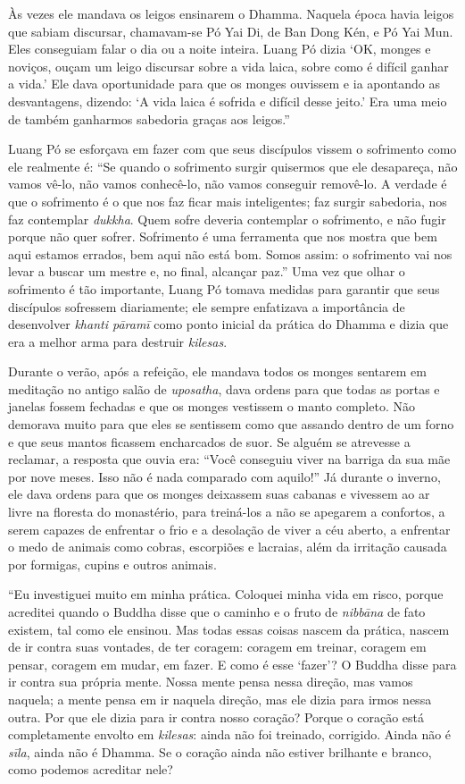 Às vezes ele mandava os leigos ensinarem o Dhamma. Naquela época havia
leigos que sabiam discursar, chamavam-se Pó Yai Di, de Ban Dong Kén, e
Pó Yai Mun. Eles conseguiam falar o dia ou a noite inteira. Luang Pó
dizia `OK, monges e noviços, ouçam um leigo discursar sobre a vida
laica, sobre como é difícil ganhar a vida.' Ele dava oportunidade para
que os monges ouvissem e ia apontando as desvantagens, dizendo: `A vida
laica é sofrida e difícil desse jeito.' Era uma meio de também ganharmos
sabedoria graças aos leigos.''

Luang Pó se esforçava em fazer com que seus discípulos vissem o
sofrimento como ele realmente é: ``Se quando o sofrimento surgir
quisermos que ele desapareça, não vamos vê-lo, não vamos conhecê-lo, não
vamos conseguir removê-lo. A verdade é que o sofrimento é o que nos faz
ficar mais inteligentes; faz surgir sabedoria, nos faz contemplar
\emph{dukkha}. Quem sofre deveria contemplar o sofrimento, e não fugir
porque não quer sofrer. Sofrimento é uma ferramenta que nos mostra que
bem aqui estamos errados, bem aqui não está bom. Somos assim: o
sofrimento vai nos levar a buscar um mestre e, no final, alcançar paz.''
Uma vez que olhar o sofrimento é tão importante, Luang Pó tomava medidas
para garantir que seus discípulos sofressem diariamente; ele sempre
enfatizava a importância de desenvolver \emph{khanti pāramī} como ponto
inicial da prática do Dhamma e dizia que era a melhor arma para destruir
\emph{kilesas}.

Durante o verão, após a refeição, ele mandava todos os monges sentarem
em meditação no antigo salão de \emph{uposatha}, dava ordens para que
todas as portas e janelas fossem fechadas e que os monges vestissem o
manto completo. Não demorava muito para que eles se sentissem como que
assando dentro de um forno e que seus mantos ficassem encharcados de
suor. Se alguém se atrevesse a reclamar, a resposta que ouvia era:
``Você conseguiu viver na barriga da sua mãe por nove meses. Isso não é
nada comparado com aquilo!'' Já durante o inverno, ele dava ordens para
que os monges deixassem suas cabanas e vivessem ao ar livre na floresta
do monastério, para treiná-los a não se apegarem a confortos, a serem
capazes de enfrentar o frio e a desolação de viver a céu aberto, a
enfrentar o medo de animais como cobras, escorpiões e lacraias, além da
irritação causada por formigas, cupins e outros animais.

``Eu investiguei muito em minha prática. Coloquei minha vida em risco,
porque acreditei quando o Buddha disse que o caminho e o fruto de
\emph{nibbāna} de fato existem, tal como ele ensinou. Mas todas essas
coisas nascem da prática, nascem de ir contra suas vontades, de ter
coragem: coragem em treinar, coragem em pensar, coragem em mudar, em
fazer. E como é esse `fazer'? O Buddha disse para ir contra sua própria
mente. Nossa mente pensa nessa direção, mas vamos naquela; a mente pensa
em ir naquela direção, mas ele dizia para irmos nessa outra. Por que ele
dizia para ir contra nosso coração? Porque o coração está completamente
envolto em \emph{kilesas}: ainda não foi treinado, corrigido. Ainda não
é \emph{sīla}, ainda não é Dhamma. Se o coração ainda não estiver
brilhante e branco, como podemos acreditar nele?

